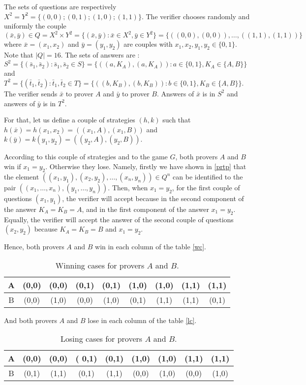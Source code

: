The sets of questions are respectively $X^2=Y^2=\{(0,0);(0,1);(1,0);(1,1)\}.$ The verifier chooses randomly and uniformly the couple $(\bar{x}, \bar{y}) \in Q=X^2 \times Y^2=\{(\bar{x}, \bar{y}): \bar{x} \in X^2, \bar{y} \in Y^2 \}=\{((0,0),(0,0)), \ldots,  ((1,1),(1,1))\}$ where $\bar{x}=(x_1,x_2)$ and $ \bar{y}=(y_1,y_2)$ are couples with $x_1, x_2, y_1, y_2 \in \{0,1\}$. Note that $|Q|=16.$ The sets of answers are :$S^2=\{(\bar{s}_1, \bar{s}_2): \bar{s}_1, \bar{s}_2 \in S\}=   \{((a,K_A), (a,K_A)): a \in \{0,1\}, K_A \in \{A,B\} \}$ and $T^2=\{(\bar{t}_1, \bar{t}_2): \bar{t}_1, \bar{t}_2 \in T\}= \{((b,K_B), (b,K_B)): b \in \{0,1\}, K_B \in \{A,B\} \}$. The verifier sends $\bar{x}$ to prover $A$ and $\bar{y}$ to prover $B$. Answers of $\bar{x}$ is in $S^2$ and answers of $\bar{y}$ is in $T^2$. 


For that, let us define a couple of strategies $(h,k)$ such that $h(\bar{x})=h(x_1,x_2)=((x_1,A),(x_1,B))$ and $k(\bar{y})=k(y_1,y_2)=((y_2,A),(y_2,B))$.

According to this couple of strategies and to the game $G$, both provers $A$ and $B$ win if $x_1=y_2$. Otherwise they lose. Namely, firstly we have shown in \eqref{prtp} that the element  $((x_1, y_1),(x_2,y_2 ), \ldots, (x_n, y_n)) \in Q^n$ can be identified to the pair $((x_1,\ldots, x_n), (y_1, \ldots, y_n)).$ Then, when $x_1=y_2$, for the first couple of questions $(x_1,y_1)$, the verifier will accept because in the second component of the answer $K_A=K_B=A$, and  in the first component of the answer $x_1=y_2$. Equally, the verifier will accept the answer of the second couple of questions $(x_2,y_2)$ because $K_A=K_B=B$ and $x_1=y_2.$

Hence, both provers $A$ and $B$ win in each column of the table \eqref{wc}.
\begin{table}[h]
\centering
\begin{tabular}{c|cccccccc} 
A & (0,0) & (0,0) &(0,1) & (0,1) & (1,0) & (1,0) & (1,1) & (1,1) \\ 
\hline 
B & (0,0) & (1,0) & (0,0) & (1,0) & (0,1) & (1,1) & (1,1) & (0,1) 
\end{tabular} 
\caption{Winning cases for provers $A$ and $B.$} \label{wc}
\end{table}

And both provers $A$ and $B$ lose in each column of the table \eqref{lc}.
\begin{table}[h]
\centering
\begin{tabular}{c|cccccccc} 
A & (0,0) & (0,0) &( 0,1) & (0,1) & (1,0) & (1,0) & (1,1) & (1,1) \\ 
\hline 
B & (0,1) & (1,1) & (0,1) & (1,1) & (0,0) & (1,0) & (0,0) & (1,0) 
\end{tabular}
\caption{Losing cases for provers $A$ and $B.$} \label{lc}
\end{table} 

